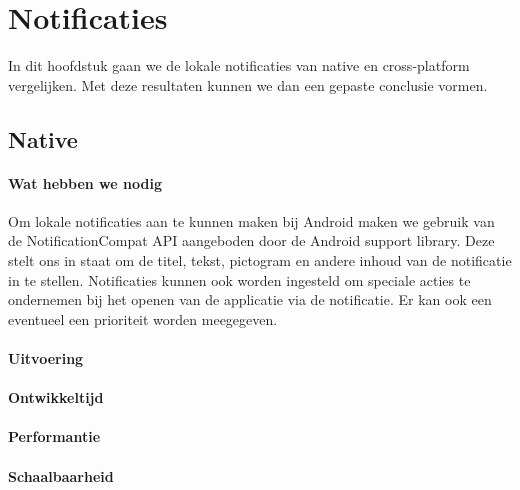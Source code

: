 
\chapter{Notificaties}%
\label{ch:notificaties}

In dit hoofdstuk gaan we de lokale notificaties van native en cross-platform vergelijken. 
Met deze resultaten kunnen we dan een gepaste conclusie vormen.

\section{Native}
\subsubsection{Wat hebben we nodig}
Om lokale notificaties aan te kunnen maken bij Android maken we gebruik van de NotificationCompat API aangeboden 
door de Android support library. Deze stelt ons in staat om de titel, tekst, pictogram en andere inhoud van de 
notificatie in te stellen. Notificaties kunnen ook worden ingesteld om speciale acties te ondernemen bij het openen 
van de applicatie via de notificatie. Er kan ook een eventueel een prioriteit worden meegegeven.

\subsubsection{Uitvoering}



\subsubsection{Ontwikkeltijd}



\subsubsection{Performantie}



\subsubsection{Schaalbaarheid}

